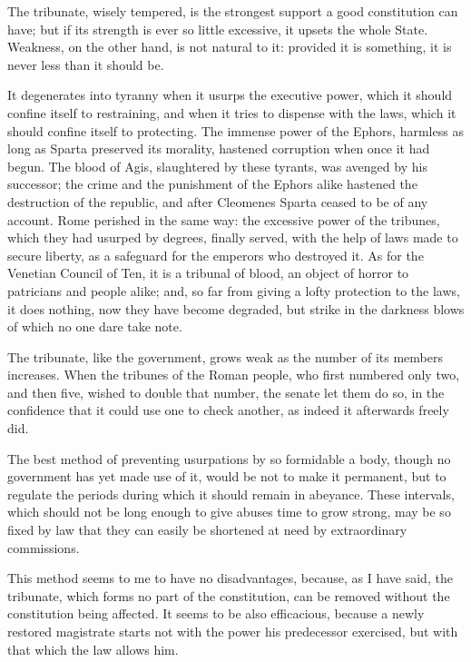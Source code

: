 \documentclass[12pt]{book}
\begin{document}
The tribunate, wisely tempered, is the strongest support a good constitution can have; but if its strength is ever so little excessive, it upsets the whole State. Weakness, on the other hand, is not natural to it: provided it is something, it is never less than it should be.

It degenerates into tyranny when it usurps the executive power, which it should confine itself to restraining, and when it tries to dispense with the laws, which it should confine itself to protecting. The immense power of the Ephors, harmless as long as Sparta preserved its morality, hastened corruption when once it had begun. The blood of Agis, slaughtered by these tyrants, was avenged by his successor; the crime and the punishment of the Ephors alike hastened the destruction of the republic, and after Cleomenes Sparta ceased to be of any account. Rome perished in the same way: the excessive power of the tribunes, which they had usurped by degrees, finally served, with the help of laws made to secure liberty, as a safeguard for the emperors who destroyed it. As for the Venetian Council of Ten, it is a tribunal of blood, an object of horror to patricians and people alike; and, so far from giving a lofty protection to the laws, it does nothing, now they have become degraded, but strike in the darkness blows of which no one dare take note.

The tribunate, like the government, grows weak as the number of its members increases. When the tribunes of the Roman people, who first numbered only two, and then five, wished to double that number, the senate let them do so, in the confidence that it could use one to check another, as indeed it afterwards freely did.

The best method of preventing usurpations by so formidable a body, though no government has yet made use of it, would be not to make it permanent, but to regulate the periods during which it should remain in abeyance. These intervals, which should not be long enough to give abuses time to grow strong, may be so fixed by law that they can easily be shortened at need by extraordinary commissions.

This method seems to me to have no disadvantages, because, as I have said, the tribunate, which forms no part of the constitution, can be removed without the constitution being affected. It seems to be also efficacious, because a newly restored magistrate starts not with the power his predecessor exercised, but with that which the law allows him.
\end{document}
